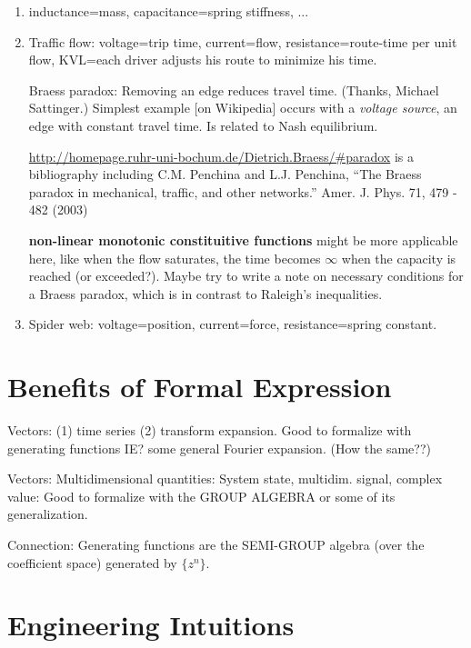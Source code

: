 \documentclass{article}
\begin{document}
\begin{enumerate}
\item inductance=mass, capacitance=spring stiffness, ...
\item Traffic flow: voltage=trip time, current=flow, resistance=route-time 
per unit flow, KVL=each driver adjusts his route to minimize his time.

Braess paradox: Removing an edge reduces travel time. (Thanks, Michael 
Sattinger.)
Simplest example [on Wikipedia] occurs with a \textit{voltage source}, an edge
with constant travel time.  Is related to Nash equilibrium.

\url{http://homepage.ruhr-uni-bochum.de/Dietrich.Braess/#paradox}
is a bibliography including 
C.M. Penchina and L.J. Penchina,
   ``The Braess paradox in mechanical, traffic, and other networks.''
\cite{BraessAJPhy}
   Amer. J. Phys. 71, 479 - 482 (2003)

\textbf{non-linear monotonic constituitive functions} might be more applicable
here, like when the flow saturates, the time becomes $\infty$ when the capacity
is reached (or exceeded?).  Maybe try to write a note on necessary 
conditions for a Braess paradox, which is in contrast to Raleigh's 
inequalities.
 
\item Spider web: voltage=position, current=force, resistance=spring constant.
\end{enumerate}

\section{Benefits of Formal Expression}

Vectors: (1) time series (2) transform expansion.  Good to formalize with
generating functions IE? some general Fourier expansion.  (How the same??)

Vectors: Multidimensional quantities: System state, multidim. signal, complex
value:  Good to formalize with the GROUP ALGEBRA or some of its generalization.

Connection:  Generating functions are the 
SEMI-GROUP algebra (over the coefficient space)
generated by $\{ z^n \}$.


\section{Engineering Intuitions}
\end{document}
